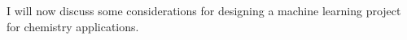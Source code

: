 I will now discuss some considerations for designing a machine learning project for chemistry applications.
